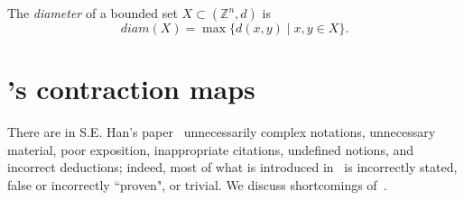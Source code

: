 \documentclass{article}
\newtheorem{prop}[thm]{Proposition}
\newtheorem{exl}[thm]{Example}
\numberwithin{thm}{section}
\def\Z{{\mathbb Z}}
\def\N{{\mathbb N}}
\begin{document}

The {\em diameter} of a bounded
set $X \subset (\Z^n,d)$ is
\[ diam(X) = \max \{ d(x,y) \mid
   x,y \in X \}.
\]

\section{\cite{Han19}'s contraction maps}
There are in S.E. Han's paper~\cite{Han19} 
unnecessarily complex notations, unnecessary material, poor exposition,
inappropriate citations, 
undefined notions, and 
incorrect deductions;
indeed, most of what is introduced 
in~\cite{Han19} is incorrectly
stated, false or incorrectly ``proven",
or trivial. We discuss
shortcomings of~\cite{Han19}.
\end{document}
